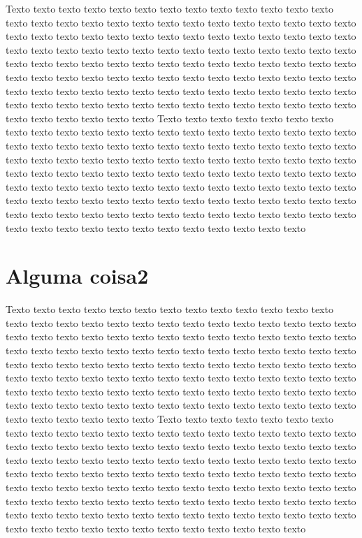 Texto texto texto texto texto texto texto texto texto texto texto texto texto
texto texto texto texto texto texto texto texto texto texto texto texto texto
texto texto texto texto texto texto texto texto texto texto texto texto texto
texto texto texto texto texto texto texto texto texto texto texto texto texto
texto texto texto texto texto texto texto texto texto texto texto texto texto 
texto texto texto texto texto texto texto texto texto texto texto texto texto 
texto texto texto texto texto texto texto texto texto texto texto texto texto 
texto texto texto texto texto texto texto texto texto texto texto texto texto 
texto texto texto texto texto texto texto texto texto texto texto texto texto
Texto texto texto texto texto texto texto texto texto texto texto texto texto
texto texto texto texto texto texto texto texto texto texto texto texto texto
texto texto texto texto texto texto texto texto texto texto texto texto texto
texto texto texto texto texto texto texto texto texto texto texto texto texto
texto texto texto texto texto texto texto texto texto texto texto texto texto 
texto texto texto texto texto texto texto texto texto texto texto texto texto 
texto texto texto texto texto texto texto texto texto texto texto texto texto 
texto texto texto texto texto texto texto texto texto texto texto texto texto 
texto texto texto texto texto texto texto texto texto texto texto texto texto
\section{Alguma coisa2}
\label{sec:amino_acidos}

Texto texto texto texto texto texto texto texto texto texto texto texto texto
texto texto texto texto texto texto texto texto texto texto texto texto texto
texto texto texto texto texto texto texto texto texto texto texto texto texto
texto texto texto texto texto texto texto texto texto texto texto texto texto
texto texto texto texto texto texto texto texto texto texto texto texto texto 
texto texto texto texto texto texto texto texto texto texto texto texto texto 
texto texto texto texto texto texto texto texto texto texto texto texto texto 
texto texto texto texto texto texto texto texto texto texto texto texto texto 
texto texto texto texto texto texto texto texto texto texto texto texto texto
Texto texto texto texto texto texto texto texto texto texto texto texto texto
texto texto texto texto texto texto texto texto texto texto texto texto texto
texto texto texto texto texto texto texto texto texto texto texto texto texto
texto texto texto texto texto texto texto texto texto texto texto texto texto
texto texto texto texto texto texto texto texto texto texto texto texto texto 
texto texto texto texto texto texto texto texto texto texto texto texto texto 
texto texto texto texto texto texto texto texto texto texto texto texto texto 
texto texto texto texto texto texto texto texto texto texto texto texto texto 
texto texto texto texto texto texto texto texto texto texto texto texto texto
